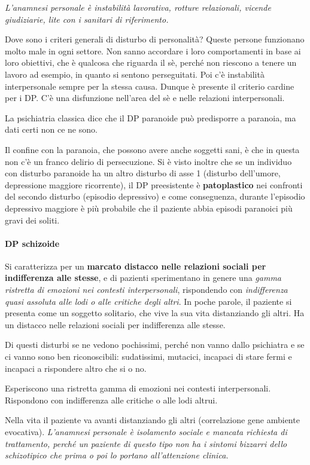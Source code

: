 \emph{\emph{L'anamnesi personale è instabilità lavorativa, rotture
relazionali, vicende giudiziarie, lite con i sanitari di riferimento. }}

Dove sono i criteri generali di disturbo di personalità? Queste persone
funzionano molto male in ogni settore. Non sanno accordare i loro
comportamenti in base ai loro obiettivi, che è qualcosa che riguarda il
sè, perché non riescono a tenere un lavoro ad esempio, in quanto si
sentono perseguitati. Poi c'è instabilità interpersonale sempre per la
stessa causa. Dunque è presente il criterio cardine per i DP. C'è una
disfunzione nell'area del sè e nelle relazioni interpersonali.

La psichiatria classica dice che il DP paranoide può predisporre a
paranoia, ma dati certi non ce ne sono.

Il confine con la paranoia, che possono avere anche soggetti sani, è che
in questa non c'è un franco delirio di persecuzione. Si è visto inoltre
che se un individuo con disturbo paranoide ha un altro disturbo di asse
1 (disturbo dell'umore, depressione maggiore ricorrente), il DP
preesistente è \textbf{patoplastico} nei confronti del secondo disturbo
(episodio depressivo) e come conseguenza, durante l'episodio depressivo
maggiore è più probabile che il paziente abbia episodi paranoici più
gravi dei soliti.

\paragraph{DP schizoide}

Si caratterizza per un \textbf{marcato distacco nelle relazioni sociali
per indifferenza alle stesse}, e di pazienti sperimentano in genere una
\emph{gamma ristretta di emozioni nei contesti interpersonali},
rispondendo con \emph{indifferenza quasi assoluta alle lodi o alle
critiche degli altri}. In poche parole, il paziente si presenta come un
soggetto solitario, che vive la sua vita distanziando gli altri. Ha un
distacco nelle relazioni sociali per indifferenza alle stesse.

Di questi disturbi se ne vedono pochissimi, perché non vanno dallo
psichiatra e se ci vanno sono ben riconoscibili: sudatissimi, mutacici,
incapaci di stare fermi e incapaci a rispondere altro che si o no.

Esperiscono una ristretta gamma di emozioni nei contesti interpersonali.
Rispondono con indifferenza alle critiche o alle lodi altrui.

Nella vita il paziente va avanti distanziando gli altri (correlazione
gene ambiente evocativa). \emph{\emph{L'anamnesi personale è isolamento
sociale e mancata richiesta di trattamento, perché un paziente di questo
tipo non ha i sintomi bizzarri dello schizotipico che prima o poi lo
portano all'attenzione clinica. }}

